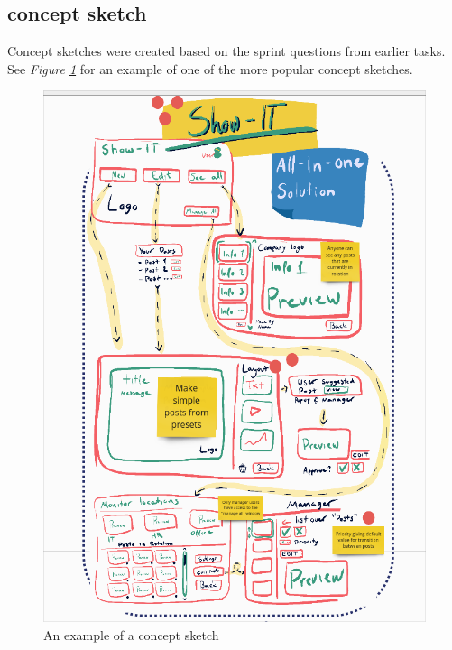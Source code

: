\documentclass[12pt]{article}
\begin{document}
\subsection{concept sketch}
Concept sketches were created based on the sprint questions from earlier tasks.
See \textit{Figure \ref{fig:SH}} for an example of one of the more popular concept sketches.
\begin{figure}[h]
    \begin{adjustwidth}{-1in}{-1in}
        \centering
        \includegraphics[scale=0.5]{show-it.png}
        \caption{An example of a concept sketch}
        \label{fig:SH}
    \end{adjustwidth}
\end{figure}
\clearpage
\end{document}
